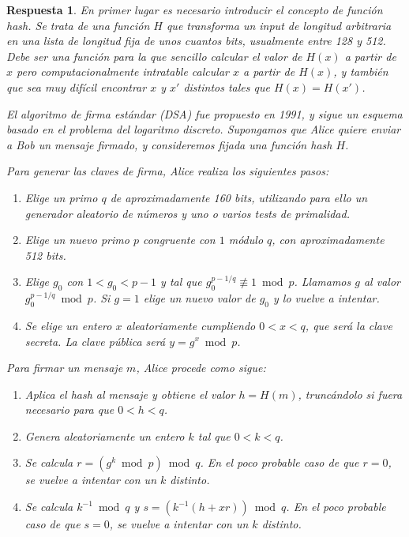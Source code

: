 \documentclass[
  a4paper,
  spanish,
  12pt,
]{scrartcl}
\theoremstyle{ejercicio-style}
\theoremstyle{remark-style}
\newtheorem*{sol}{Respuesta}
\theoremstyle{teorema-style}
\begin{document}
\begin{sol}
  En primer lugar es necesario introducir el concepto de \textit{función hash}. Se trata de una función $H$ que transforma un \textit{input} de longitud arbitraria en una lista de longitud fija de unos cuantos bits, usualmente entre 128 y 512. Debe ser una función para la que sencillo calcular el valor de $H(x)$ a partir de $x$ pero computacionalmente intratable calcular $x$ a partir de $H(x)$, y también que sea muy difícil encontrar $x$ y $x'$ distintos tales que $H(x)=H(x')$.

  El algoritmo de firma estándar (DSA) fue propuesto en 1991, y sigue un esquema basado en el problema del logaritmo discreto. Supongamos que Alice quiere enviar a Bob un mensaje firmado, y consideremos fijada una función hash $H$.

  Para generar las claves de firma, Alice realiza los siguientes pasos:

  \begin{enumerate}
    \item Elige un primo $q$ de aproximadamente 160 bits, utilizando para ello un generador aleatorio de números y uno o varios tests de primalidad.
    \item Elige un nuevo primo $p$ congruente con $1$ módulo $q$, con aproximadamente 512 bits.
    \item Elige $g_0$ con $1 < g_0 < p-1$ y tal que $g_0 ^{p-1/q} \not\equiv 1 \bmod p$. Llamamos $g$ al valor  $g_0 ^{p-1/q} \bmod p$. Si $g=1$ elige un nuevo valor de $g_0$ y lo vuelve a intentar.
    \item Se elige un entero $x$ aleatoriamente cumpliendo $0 < x < q$, que será la clave secreta. La clave pública será $y = g^x \bmod p$.
  \end{enumerate}

  Para firmar un mensaje $m$, Alice procede como sigue:
  \begin{enumerate}
    \item Aplica el hash al mensaje y obtiene el valor $h = H(m)$, truncándolo si fuera necesario para que $0 < h < q$.
    \item Genera aleatoriamente un entero $k$ tal que $0 < k < q$.
    \item Se calcula $r=(g^k \bmod p) \bmod q$. En el poco probable caso de que $r=0$, se vuelve a intentar con un $k$ distinto.
    \item Se calcula $k^{-1} \bmod q$ y $s = (k^{-1}(h + xr)) \bmod q$. En el poco probable caso de que $s=0$, se vuelve a intentar con un $k$ distinto.
  \end{enumerate}


\end{sol}
\end{document}
